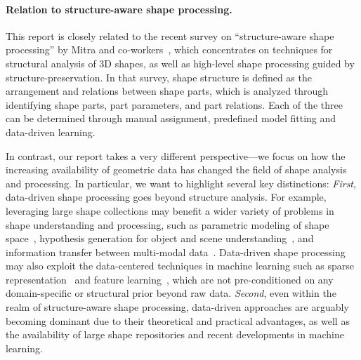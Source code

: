 \paragraph*{Relation to structure-aware shape processing.}
This report is closely related to the recent survey on ``structure-aware shape processing'' by Mitra and co-workers~\cite{Mitra:2014:SASP},
which concentrates on techniques for structural analysis of 3D shapes, as well as high-level shape processing guided by structure-preservation.
In that survey, shape structure is defined as the arrangement and relations between shape parts, which is analyzed through identifying shape parts, part parameters, and part relations. Each of the three can be determined through manual assignment, predefined model fitting and data-driven learning.

In contrast, our report takes a very different perspective---we focus on how the increasing availability of geometric data has changed the field of shape analysis and processing. In particular, we want to highlight several key distinctions:
\emph{First}, data-driven shape processing goes beyond structure analysis.
For example, leveraging large shape collections may benefit a wider variety of problems in shape understanding and processing, such as parametric modeling of shape space~\cite{Allen:2003:SHB}, hypothesis generation for object and scene understanding~\cite{Zia:2013:DR,Satkin:2012:DDS}, and information transfer between multi-modal data~\cite{Wang:2013:PAS,Su:2014:EID}. Data-driven shape processing may also exploit the data-centered techniques in machine learning such as sparse representation~\cite{Ren:2013:HSC} and feature learning~\cite{Hinton:DBN:2006,Bengio:2009:LDA,Yu:FLI:2010,Krizhevsky:ICDL:2012}, which are not pre-conditioned on any domain-specific or structural prior beyond raw data.
%
\emph{Second}, even within the realm of structure-aware shape processing, data-driven approaches are arguably becoming dominant due to their theoretical and practical advantages, as well as the availability of large shape repositories and recent developments in machine learning.



